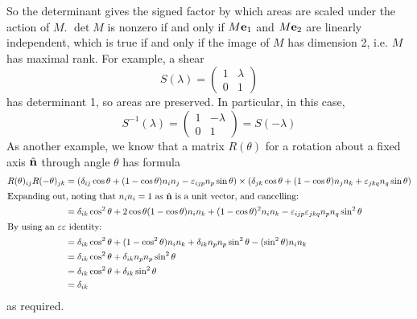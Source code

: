 \documentclass{article}
\begin{document}
So the determinant gives the signed factor by which areas are scaled under the action of $M$. $\det M$ is nonzero if and only if $M\vb e_1$ and $M\vb e_2$ are linearly independent, which is true if and only if the image of $M$ has dimension 2, i.e. $M$ has maximal rank. For example, a shear
\[ S(\lambda) = \begin{pmatrix}
        1 & \lambda \\ 0 & 1
    \end{pmatrix} \]
has determinant 1, so areas are preserved. In particular, in this case,
\[ S^{-1}(\lambda) = \begin{pmatrix}
        1 & -\lambda \\ 0 & 1
    \end{pmatrix} = S(-\lambda) \]
As another example, we know that a matrix $R(\theta)$ for a rotation about a fixed axis $\hat{\vb n}$ through angle $\theta$ has formula
\begin{align*}
    R(\theta)_{ij} R(-\theta)_{jk} & = (\delta_{ij}\cos \theta + (1 - \cos \theta) n_i n_j - \varepsilon_{ijp}n_p \sin \theta) \times (\delta_{jk}\cos \theta + (1 - \cos \theta) n_j n_k + \varepsilon_{jkq}n_q \sin \theta) \\
    \intertext{Expanding out, noting that $n_in_i = 1$ as $\hat{\vb n}$ is a unit vector, and cancelling:}
                                   & = \delta_{ik} \cos^2 \theta + 2\cos \theta(1 - \cos \theta) n_in_k + (1 - \cos \theta)^2n_in_k - \varepsilon_{ijp}\varepsilon_{jkq} n_p n_q \sin^2 \theta                                \\
    \intertext{By using an $\varepsilon\varepsilon$ identity:}
                                   & = \delta_{ik}\cos^2\theta + (1 - \cos^2 \theta)n_in_k + \delta_{ik}n_pn_p \sin^2 \theta - (\sin^2 \theta)n_in_k                                                                          \\
                                   & = \delta_{ik}\cos^2\theta + \delta_{ik}n_pn_p \sin^2 \theta                                                                                                                              \\
                                   & = \delta_{ik}\cos^2\theta + \delta_{ik} \sin^2 \theta                                                                                                                                    \\
                                   & = \delta_{ik}
\end{align*}
as required.
\end{document}
